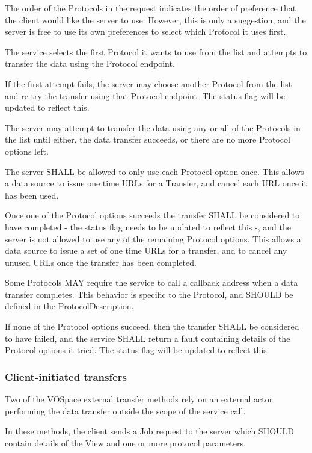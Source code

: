 \documentclass[11pt,a4paper]{ivoa}
\begin{document}
The order of the Protocols in the request indicates the order of preference that the client would like the server to use. However, this is only a suggestion, and the server is free to use its own preferences to select which Protocol it uses first.

The service selects the first Protocol it wants to use from the list and attempts to transfer the data using the Protocol endpoint.

If the first attempt fails, the server may choose another Protocol from the list and re-try the transfer using that Protocol endpoint. The status flag will be updated to reflect this.

The server may attempt to transfer the data using any or all of the Protocols in the list until either, the data transfer succeeds, or there are no more Protocol options left.

The server SHALL be allowed to only use each Protocol option once. This allows a data source to issue one time URLs for a Transfer, and cancel each URL once it has been used.

Once one of the Protocol options succeeds the transfer SHALL be considered to have completed - the status flag needs to be updated to reflect this -, and the server is not allowed to use any of the remaining Protocol options. This allows a data source to issue a set of one time URLs for a transfer, and to cancel any unused URLs once the transfer has been completed.

Some Protocols MAY require the service to call a callback address when a data transfer completes. This behavior is specific to the Protocol, and SHOULD be defined in the ProtocolDescription.

If none of the Protocol options succeed, then the transfer SHALL be considered to have failed, and the service SHALL return a fault containing details of the Protocol options it tried. The status flag will be updated to reflect this.

\subsubsection{Client-initiated transfers}
Two of the VOSpace external transfer methods rely on an external actor performing the data transfer outside the scope of the service call.

In these methods, the client sends a Job request to the server which SHOULD contain details of the View and one or more protocol parameters.
\end{document}
